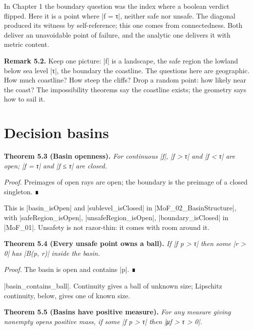 \documentclass{memoir}
\begin{document}
In Chapter 1 the boundary question was the index where a boolean verdict
flipped. Here it is a point where \LeanVerb|f = τ|, neither safe nor unsafe. The diagonal
produced its witness by self-reference; this one comes from connectedness. Both
deliver an unavoidable point of failure, and the analytic one delivers it with
metric content.

\textbf{Remark 5.2.} Keep one picture: \LeanVerb|f| is a landscape, the safe region the lowland below
sea level \LeanVerb|τ|, the boundary the coastline. The questions here are geographic.
How much coastline? How steep the cliffs? Drop a random point: how likely near
the coast? The impossibility theorems say the coastline exists; the geometry
says how to sail it.



\section{Decision basins}\label{Two--Schemas--of--Impossibility-005F-005F-005F--Machine--Checked--Limits--of--Trustworthy--Machine--Learning-005F-005F-005F--and--Why--They--Tighten--with--Capability----The--Geometry--of--Attacks----Decision--basins}

\textbf{Theorem 5.3 (Basin openness).} \emph{For continuous \LeanVerb|f|, \LeanVerb|f > τ| and \LeanVerb|f < τ| are open;
\LeanVerb|f = τ| and \LeanVerb|f ≤ τ| are closed.}

\emph{Proof.} Preimages of open rays are open; the boundary is the preimage of a closed
singleton. ∎

This is \LeanVerb|basin_isOpen| and \LeanVerb|sublevel_isClosed| in \LeanVerb|MoF_02_BasinStructure|, with
\LeanVerb|safeRegion_isOpen|, \LeanVerb|unsafeRegion_isOpen|, \LeanVerb|boundary_isClosed| in \LeanVerb|MoF_01|.
Unsafety is not razor-thin: it comes with room around it.

\textbf{Theorem 5.4 (Every unsafe point owns a ball).} \emph{If \LeanVerb|f p > τ| then some \LeanVerb|r > 0| has
\LeanVerb|B(p, r)| inside the basin.}

\emph{Proof.} The basin is open and contains \LeanVerb|p|. ∎

\LeanVerb|basin_contains_ball|. Continuity gives a ball of unknown size; Lipschitz
continuity, below, gives one of known size.

\textbf{Theorem 5.5 (Basins have positive measure).} \emph{For any measure giving nonempty opens
positive mass, if some \LeanVerb|f p > τ| then \LeanVerb|μf > τ > 0|.}
\end{document}
